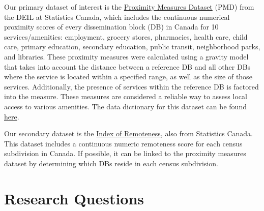 \documentclass[11pt, a4paper]{article}
\begin{document}
Our primary dataset of interest is the \href{https://www150.statcan.gc.ca/n1/pub/17-26-0002/2020001/csv/pmd-eng.zip}{Proximity Measures Dataset} (PMD) from the DEIL at Statistics Canada, which includes the continuous numerical proximity scores of every dissemination block (DB) in Canada for 10 services/amenities: employment, grocery stores, pharmacies, health care, child care, primary education, secondary education, public transit, neighborhood parks, and libraries. These proximity measures were calculated using a gravity model that takes into account the distance between a reference DB and all other DBs where the service is located within a specified range, as well as the size of those services. Additionally, the presence of services within the reference DB is factored into the measure. These measures are considered a reliable way to assess local access to various amenities. The data dictionary for this dataset can be found \href{https://www150.statcan.gc.ca/n1/pub/71-607-x/71-607-x2020011-eng.htm}{here}.
\par
Our secondary dataset is the \href{https://www150.statcan.gc.ca/n1/pub/17-26-0001/172600012020001-eng.htm}{Index of Remoteness}, also from Statistics Canada. This dataset includes a continuous numeric remoteness score for each census subdivision in Canada. If possible, it can be linked to the proximity measures dataset by determining which DBs reside in each census subdivision. 






\section*{Research Questions}
\end{document}
